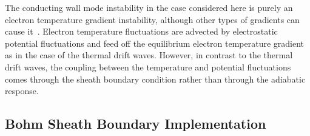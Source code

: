 The conducting wall mode instability in the case considered here is purely an electron temperature gradient instability, although other types of gradients can cause it~\cite{berk1993}.
Electron temperature fluctuations are advected by electrostatic potential fluctuations and feed off the equilibrium electron temperature gradient as in the case of the thermal drift waves.
However, in contrast to the thermal drift waves, the coupling between the temperature and potential fluctuations comes through the sheath boundary condition rather than through the adiabatic
response.

\subsection{Bohm Sheath Boundary Implementation}
\label{ss_sheath_implementation}





\cite{xu1993}
